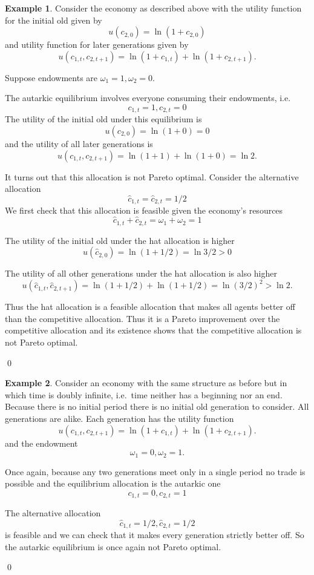 \documentclass[11pt,reqno,openany]{amsbook}
\theoremstyle{plain}
\theoremstyle{definition}
\newtheorem{exmp}{Example}[chapter]
\begin{document}
\begin{exmp}\label{exmp:olg-np-single}
Consider the economy as described above with the utility function
for the initial old given by
\[u(c_{2,0})=\ln(1+c_{2,0})\]
and utility function for later generations given by
\[u(c_{1,t},c_{2,t+1})=\ln(1+c_{1,t})+\ln(1+c_{2,t+1}).\]

Suppose endowments are $\omega_1=1,\omega_2=0$.

The autarkic equilibrium involves everyone consuming their endowments,
i.e.
\[c_{1,t}=1, c_{2,t}=0\]
The utility of the initial old under this equilibrium is
\[u(c_{2,0})=\ln (1+0)=0\]
and the utility of all later generations is
\[u(c_{1,t},c_{2,t+1})=\ln(1+1)+\ln(1+0)=\ln 2.\]

It turns out that this allocation is not Pareto optimal. Consider the
alternative allocation
\[\hat c_{1,t}=\hat c_{2,t}=1/2\]
We first check that this allocation is feasible given the economy's
resources
\[\hat c_{1,t}+\hat c_{2,t}=\omega_1+\omega_2=1\]

The utility of the initial old under the hat allocation is higher
\[u(\hat c_{2,0})=\ln (1+1/2) = \ln 3/2 >0\]

The utility of all other generations under the hat allocation is also
higher
\[u(\hat c_{1,t},\hat c_{2,t+1})=\ln (1+1/2)+\ln(1+1/2)=\ln (3/2)^2 >
\ln 2.\]

Thus the hat allocation is a feasible allocation that makes all agents
better off than the competitive allocation. Thus it is a Pareto
improvement over the competitive allocation and its existence shows
that the competitive allocation is not Pareto optimal.

\qed
\end{exmp}

\begin{exmp}\label{exmp:olg-np-double}
Consider an economy with the same structure as before but in which
time is doubly infinite, i.e.\ time neither has a beginning nor an
end. Because there is no initial period there is no initial old
generation to consider. All generations are alike. Each generation has
the utility function
\[u(c_{1,t},c_{2,t+1})=\ln(1+c_{1,t})+\ln(1+c_{2,t+1}).\]
and the endowment
\[\omega_1=0, \omega_2=1.\]

Once again, because any two generations meet only in a single period
no trade is possible and the equilibrium allocation is the autarkic
one
\[c_{1,t}=0, c_{2,t}=1\]

The alternative allocation
\[\hat c_{1,t}=1/2, \hat c_{2,t}=1/2\]
is feasible and we can check that it makes every generation strictly
better off. So the autarkic equilibrium is once again not Pareto
optimal.

\qed
\end{exmp}
\end{document}
